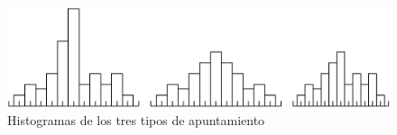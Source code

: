 \documentclass[12pt]{report}
\begin{document}
\begin{figure}
\begin{center}
\includegraphics{histogramas3.eps}
\end{center}
\caption{Histogramas de los tres tipos de apuntamiento}
\end{figure}
\end{document}
